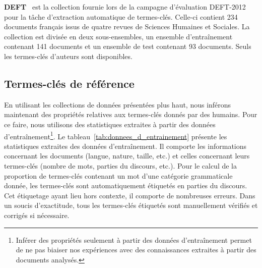     \textbf{DEFT}~\cite{paroubek2012deft} est la collection fournie lors de la
    campagne d'évaluation DEFT-2012 pour la tâche d'extraction automatique de
    termes-clés. Celle-ci contient 234 documents français issus de quatre revues
    de Sciences Humaines et Sociales. La collection est divisée en deux
    sous-ensembles, un ensemble d'entraînement contenant 141 documents et un
    ensemble de test contenant 93 documents. Seuls les termes-clés d'auteurs
    sont disponibles.

  \subsection{Termes-clés de référence}
  \label{subsec:termes_cles_de_reference}
    En utilisant les collections de données présentées plus haut, nous inférons
    maintenant des propriétés relatives aux termes-clés donnés par des humains.
    Pour ce faire, nous utilisons des statistiques extraites à partir des
    données d'entraînement\footnote{Inférer des propriétés seulement à partir
    des données d'entraînement permet de ne pas biaiser nos expériences avec des
    connaissances extraites à partir des documents analysés.}. Le
    tableau~\ref{tab:donnees_d_entrainement} présente les statistiques extraites
    des données d'entraînement. Il comporte les informations concernant les
    documents (langue, nature, taille, etc.) et celles concernant leurs
    termes-clés (nombre de mots, parties du discours, etc.). Pour le calcul de
    la proportion de termes-clés contenant un mot d'une catégorie grammaticale
    donnée, les termes-clés sont automatiquement étiquetés en parties du
    discours. Cet étiquetage ayant lieu hors contexte, il comporte de nombreuses
    erreurs. Dans un soucis d'exactitude, tous les termes-clés étiquetés sont
    manuellement vérifiés et corrigés si nécessaire.

